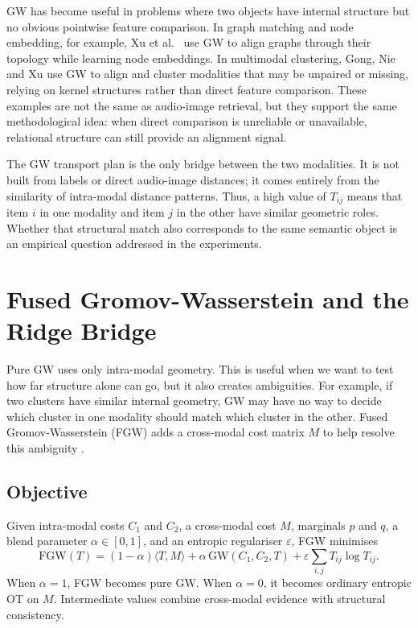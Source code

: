 GW has become useful in problems where two objects have internal structure but no obvious pointwise feature comparison. In graph matching and node embedding, for example, Xu et al.\ \cite{xu2019gromov} use GW to align graphs through their topology while learning node embeddings. In multimodal clustering, Gong, Nie and Xu \cite{gong2022gromov} use GW to align and cluster modalities that may be unpaired or missing, relying on kernel structures rather than direct feature comparison. These examples are not the same as audio-image retrieval, but they support the same methodological idea: when direct comparison is unreliable or unavailable, relational structure can still provide an alignment signal.

The GW transport plan is the only bridge between the two modalities. It is not built from labels or direct audio-image distances; it comes entirely from the similarity of intra-modal distance patterns. Thus, a high value of $T_{ij}$ means that item $i$ in one modality and item $j$ in the other have similar geometric roles. Whether that structural match also corresponds to the same semantic object is an empirical question addressed in the experiments.

\section{Fused Gromov-Wasserstein and the Ridge Bridge}
\label{sec:fgw}

Pure GW uses only intra-modal geometry. This is useful when we want to test how far structure alone can go, but it also creates ambiguities. For example, if two clusters have similar internal geometry, GW may have no way to decide which cluster in one modality should match which cluster in the other. Fused Gromov-Wasserstein (FGW) adds a cross-modal cost matrix $M$ to help resolve this ambiguity \cite{vayer2019optimal,vayer2020fused}.

\subsection{Objective}

Given intra-modal costs $C_1$ and $C_2$, a cross-modal cost $M$, marginals $p$ and $q$, a blend parameter $\alpha \in [0,1]$, and an entropic regulariser $\varepsilon$, FGW minimises
\[
\mathrm{FGW}(T)
=
(1-\alpha)\langle T,M\rangle
+
\alpha\,\mathrm{GW}(C_1,C_2,T)
+
\varepsilon \sum_{i,j} T_{ij}\log T_{ij}.
\]
When $\alpha=1$, FGW becomes pure GW. When $\alpha=0$, it becomes ordinary entropic OT on $M$. Intermediate values combine cross-modal evidence with structural consistency.

